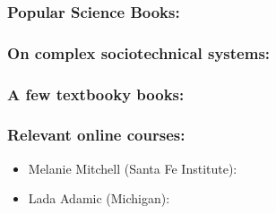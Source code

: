 \begin{frame}
  \frametitle{Popular Science Books:}

  \medskip
  \medskip

\end{frame}

\begin{frame}
  \frametitle{On complex sociotechnical systems:}

  \medskip
  \medskip

\end{frame}

\begin{frame}
  \frametitle{A few textbooky books:}

  \medskip
  \medskip

\end{frame}


\begin{frame}
  \frametitle{Relevant online courses:}

  \begin{itemize}
  \item 
    Melanie Mitchell (Santa Fe Institute): \\
  \item   
    Lada Adamic (Michigan): \\
  \end{itemize}

\end{frame}

